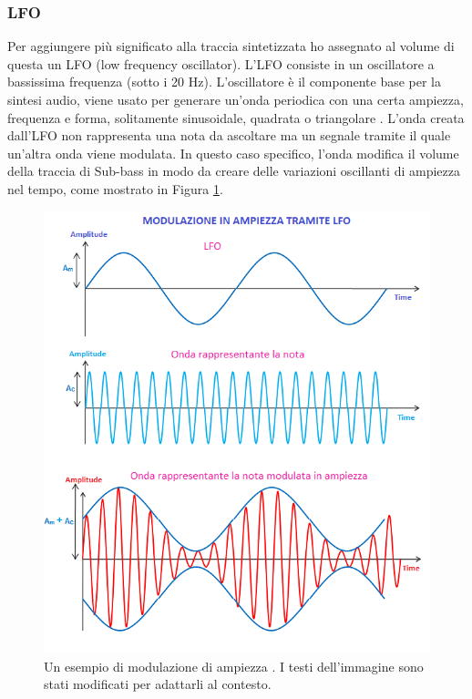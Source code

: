 \subsubsection{LFO}
Per aggiungere più significato alla traccia sintetizzata ho assegnato al volume di questa un LFO (low frequency oscillator).
L'LFO consiste in un oscillatore a bassissima frequenza (sotto i 20 Hz). L'oscillatore è il componente base per la sintesi audio, viene usato per generare un'onda periodica con una certa ampiezza, frequenza e forma, solitamente sinusoidale, quadrata o triangolare \cite{izotope}.
L'onda creata dall'LFO non rappresenta una nota da ascoltare ma un segnale tramite il quale un'altra onda viene modulata.
In questo caso specifico, l'onda modifica il volume della traccia di Sub-bass in modo da creare delle variazioni oscillanti di ampiezza nel tempo, come mostrato in Figura \ref{fig:lfo}.
\begin{figure}[H]
    \includegraphics[width=\linewidth]{img/lfo.png}
    \caption{Un esempio di modulazione di ampiezza \cite{lfo_img}. I testi dell'immagine sono stati modificati per adattarli al contesto.}
    \label{fig:lfo}
\end{figure}
